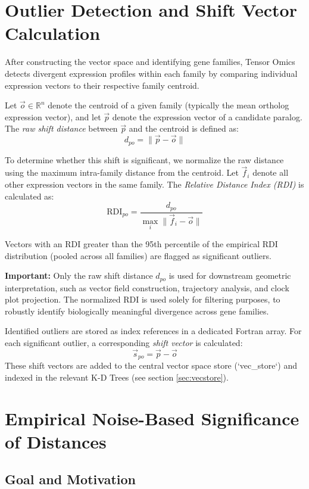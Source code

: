 \documentclass{article}
\begin{document}
\section{Outlier Detection and Shift Vector Calculation}
\label{sec:outlier_detection}

After constructing the vector space and identifying gene families, Tensor Omics detects divergent expression profiles within each family by comparing individual expression vectors to their respective family centroid.

Let \( \vec{o} \in \mathbb{R}^n \) denote the centroid of a given family (typically the mean ortholog expression vector), and let \( \vec{p} \) denote the expression vector of a candidate paralog. The \emph{raw shift distance} between \( \vec{p} \) and the centroid is defined as:
\[
d_{po} = \| \vec{p} - \vec{o} \|
\]

To determine whether this shift is significant, we normalize the raw distance using the maximum intra-family distance from the centroid. Let \( \vec{f}_i \) denote all other expression vectors in the same family. The \emph{Relative Distance Index (RDI)} is calculated as:
\[
\text{RDI}_{po} = \frac{d_{po}}{\max_i \| \vec{f}_i - \vec{o} \|}
\]

Vectors with an RDI greater than the 95th percentile of the empirical RDI distribution (pooled across all families) are flagged as significant outliers.

\textbf{Important:} Only the raw shift distance \( d_{po} \) is used for downstream geometric interpretation, such as vector field construction, trajectory analysis, and clock plot projection. The normalized RDI is used solely for filtering purposes, to robustly identify biologically meaningful divergence across gene families.

Identified outliers are stored as index references in a dedicated Fortran array. For each significant outlier, a corresponding \emph{shift vector} is calculated:
\[
\vec{s}_{po} = \vec{p} - \vec{o}
\]
These shift vectors are added to the central vector space store (`vec\_store`)
and indexed in the relevant K-D Trees (see section \ref{sec:vecstore}).

\section{Empirical Noise-Based Significance of Distances}

\subsection{Goal and Motivation}
\end{document}
